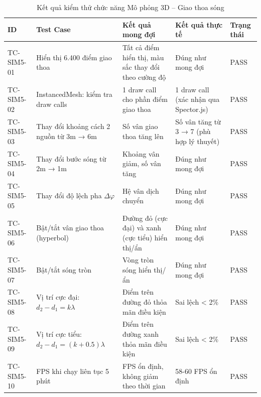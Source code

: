 \begin{table}[H]
\centering
\caption{Kết quả kiểm thử chức năng Mô phỏng 3D – Giao thoa sóng}
\begin{tabular}{|p{}|p{}|p{}|p{}|p{}|}
\hline
\textbf{ID} & \textbf{Test Case} & \textbf{Kết quả mong đợi} & \textbf{Kết quả thực tế} & \textbf{Trạng thái} \\
\hline
TC-SIM5-01 & Hiển thị 6.400 điểm giao thoa & Tất cả điểm hiển thị, màu sắc thay đổi theo cường độ & Đúng như mong đợi & PASS \\
\hline
TC-SIM5-02 & InstancedMesh: kiểm tra draw calls & 1 draw call cho phần điểm giao thoa & 1 draw call (xác nhận qua Spector.js) & PASS \\
\hline
TC-SIM5-03 & Thay đổi khoảng cách 2 nguồn từ 3m → 6m & Số vân giao thoa tăng lên & Số vân tăng từ 3 → 7 (phù hợp lý thuyết) & PASS \\
\hline
TC-SIM5-04 & Thay đổi bước sóng từ 2m → 1m & Khoảng vân giảm, số vân tăng & Đúng như mong đợi & PASS \\
\hline
TC-SIM5-05 & Thay đổi độ lệch pha $\Delta\varphi$ & Hệ vân dịch chuyển & Đúng như mong đợi & PASS \\
\hline
TC-SIM5-06 & Bật/tắt vân giao thoa (hyperbol) & Đường đỏ (cực đại) và xanh (cực tiểu) hiển thị/ẩn & Đúng như mong đợi & PASS \\
\hline
TC-SIM5-07 & Bật/tắt sóng tròn & Vòng tròn sóng hiển thị/ẩn & Đúng như mong đợi & PASS \\
\hline
TC-SIM5-08 & Vị trí cực đại: $d_2 - d_1 = k\lambda$ & Điểm trên đường đỏ thỏa mãn điều kiện & Sai lệch < 2\% & PASS \\
\hline
TC-SIM5-09 & Vị trí cực tiểu: $d_2 - d_1 = (k+0.5)\lambda$ & Điểm trên đường xanh thỏa mãn điều kiện & Sai lệch < 2\% & PASS \\
\hline
TC-SIM5-10 & FPS khi chạy liên tục 5 phút & FPS ổn định, không giảm theo thời gian & 58-60 FPS ổn định & PASS \\
\hline
\end{tabular}
\end{table}

